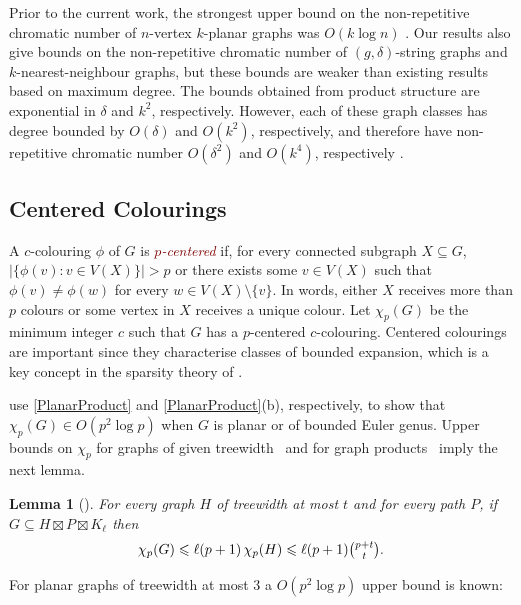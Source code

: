 \documentclass{patmorin}
\theoremstyle{plain}
\newtheorem{lem}[thm]{Lemma}
\theoremstyle{definition}
\newcommand{\defin}[1]{\textcolor{Maroon}{\emph{#1}}}
\newcommand{\note}[2]{\noindent{\color{red}[#1:~#2]}}
\renewcommand{\le}{\leqslant}
\renewcommand{\leq}{\leqslant}
\begin{document}
Prior to the current work, the strongest upper bound on the non-repetitive chromatic number of $n$-vertex  $k$-planar graphs was $O(k\log n)$ \cite{dujmovic.morin.ea:layered}.  Our results also give bounds on the non-repetitive chromatic number of $(g,\delta)$-string graphs and $k$-nearest-neighbour graphs, but these bounds are weaker than existing results based on maximum degree.  The bounds obtained from product structure are exponential in $\delta$ and $k^2$, respectively.  However, each of these graph classes has degree bounded by $O(\delta)$ and $O(k^2)$, respectively, and therefore have non-repetitive chromatic number $O(\delta^2)$ and $O(k^{4})$, respectively \cite{DJKW16}.

\subsection{Centered Colourings}
\label{centered-colourings}

A $c$-colouring $\phi$ of $G$ is \defin{$p$-centered} if, for every connected subgraph $X\subseteq G$, $|\{\phi(v):v\in V(X)\}| > p$ or there exists some $v\in V(X)$ such that $\phi(v)\neq \phi(w)$ for every $w\in V(X)\setminus\{v\}$.  In words, either $X$ receives more than $p$ colours or some vertex in $X$ receives a unique colour.  Let $\chi_p(G)$ be the minimum integer $c$ such that $G$ has a $p$-centered $c$-colouring. Centered colourings are important since they characterise classes of bounded expansion, which is a key concept in the sparsity theory of \citet{Sparsity}.

\citet{DFMS21} use \cref{PlanarProduct} and \cref{PlanarProduct}(b), respectively, to show that $\chi_p(G)\in O(p^2\log p)$ when $G$ is planar or of bounded Euler genus.  Upper bounds on $\chi_p$ for graphs of given treewidth~\citep{PS21} and for graph products~\citep{DFMS21} imply the next lemma.

\begin{lem}[\citep{DFMS21,PS21}]
\label{p-centered}
For every graph $H$ of treewidth at most $t$ and for every path $P$, if $G\subseteq H\boxtimes P \boxtimes K_\ell$ then
\[\chi_p(G)\le \ell (p+1)\, \chi_p(H) \leq \ell (p+1) \tbinom{p+t}{t}.\]
\end{lem}



For planar graphs of treewidth at most $3$ a $O(p^2\log p)$ upper bound is known:
\end{document}
